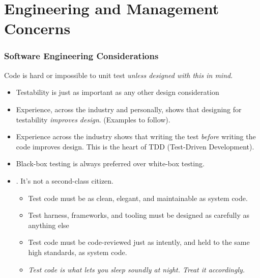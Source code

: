 \section{Engineering and Management Concerns}
\begin{frame}[fragile,t]
\frametitle{Software Engineering Considerations}
Code is hard or impossible to unit test \emph{unless designed with
  this in mind}.
\begin{itemize}
\item Testability is just as important as any other design
  consideration
\item Experience, across the industry and personally, shows that
  designing for testability \emph{improves design}.  (Examples to
  follow).
\item Experience across the industry shows that writing the test
  \emph{before} writing the code improves design.  This is the heart
  of TDD (Test-Driven Development).
\item Black-box testing is always preferred over white-box testing.
\item {}.  It's not a
  second-class citizen.
\begin{itemize}
  \item Test code must be as clean, elegant, and maintainable as
    system code.
  \item Test harness, frameworks, and tooling must be designed as
    carefully as anything else
  \item Test code must be code-reviewed just as intently, and held to
    the same high standards, as system code.
  \item \emph{Test code is what lets you sleep soundly at night.
      Treat it accordingly.}
\end{itemize}
\end{itemize}

\end{frame}



